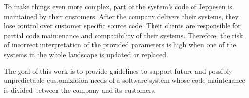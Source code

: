 %
%

To make things even more complex, part of the system's code of Jeppesen %
is maintained by their customers. After the
company delivers their systems, they lose control over customer specific source code. Their clients are responsible for partial code maintenance and compatibility of their systems. Therefore, the risk of incorrect interpretation of the provided parameters is high when one of the systems in the whole landscape is updated or replaced.



The goal of this work is to provide guidelines to 
support future and possibly unpredictable customization needs of a software system whose code maintenance is divided between the company and its customers. 


